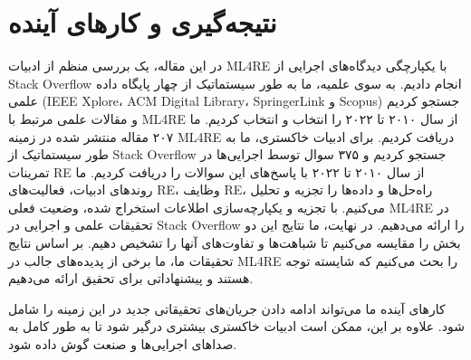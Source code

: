 \documentclass[a4paper,10pt]{article}
\begin{document}

    \section{نتیجه‌گیری و کارهای آینده}

        در این مقاله، یک بررسی منظم از ادبیات ML4RE با یکپارچگی دیدگاه‌های اجرایی از Stack Overflow انجام دادیم. به سوی علمیه، ما به طور سیستماتیک از چهار پایگاه داده علمی (IEEE Xplore، ACM Digital Library، SpringerLink و Scopus) جستجو کردیم و مقالات علمی مرتبط با ML4RE از سال ۲۰۱۰ تا ۲۰۲۲ را انتخاب و انتخاب کردیم. ما ۲۰۷ مقاله منتشر شده در زمینه ML4RE دریافت کردیم. برای ادبیات خاکستری، ما به طور سیستماتیک از Stack Overflow جستجو کردیم و ۳۷۵ سوال توسط اجرایی‌ها در تمرینات RE از سال ۲۰۱۰ تا ۲۰۲۲ با پاسخ‌های این سوالات را دریافت کردیم. ما روندهای ادبیات، فعالیت‌های RE، وظایف RE، راه‌حل‌ها و داده‌ها را تجزیه و تحلیل می‌کنیم. با تجزیه و یکپارچه‌سازی اطلاعات استخراج شده، وضعیت فعلی ML4RE در تحقیقات علمی و اجرایی در Stack Overflow را ارائه می‌دهیم. در نهایت، ما نتایج این دو بخش را مقایسه می‌کنیم تا شباهت‌ها و تفاوت‌های آنها را تشخیص دهیم. بر اساس نتایج تحقیقات ما، ما برخی از پدیده‌های جالب در ML4RE را بحث می‌کنیم که شایسته توجه هستند و پیشنهاداتی برای تحقیق ارائه می‌دهیم.

        کارهای آینده ما می‌تواند ادامه دادن جریان‌های تحقیقاتی جدید در این زمینه را شامل شود. علاوه بر این، ممکن است ادبیات خاکستری بیشتری درگیر شود تا به طور کامل به صداهای اجرایی‌ها و صنعت گوش داده شود.
\end{document}
